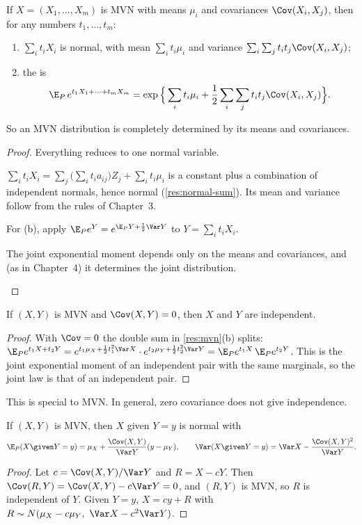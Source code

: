 \begin{result}
\label{res:mvn}
If $X=(X_1,\dots,X_m)$ is MVN with means $\mu_i$ and covariances $\Cov(X_i,X_j)$, then for any numbers $t_1,\dots,t_m$:
\begin{enumerate}[label=(\alph*)]
  \item $\sum_it_iX_i$ is normal, with mean $\sum_it_i\mu_i$ and variance $\sum_i\sum_jt_it_j\Cov(X_i,X_j)$;
  \item the  is
  \[
    \E_P\,e^{t_1X_1+\dots+t_mX_m}=\exp\Big\{\sum_it_i\mu_i+\frac12\sum_i\sum_jt_it_j\Cov(X_i,X_j)\Big\}.
  \]
\end{enumerate}
So an MVN distribution is completely determined by its means and covariances.
\end{result}
\begin{proof}
Everything reduces to one normal variable.
\begin{steps}
  \item $\sum_it_iX_i=\sum_j\big(\sum_it_ia_{ij}\big)Z_j+\sum_it_i\mu_i$ is a constant plus a combination of independent normals, hence normal (\cref{res:normal-sum}). Its mean and variance follow from the rules of Chapter~3.
  \item For (b), apply $\E_Pe^{Y}=e^{\E_PY+\frac12\Var Y}$ to $Y=\sum_it_iX_i$.
  \item The joint exponential moment depends only on the means and covariances, and (as in Chapter~4) it determines the joint distribution. \qedhere
\end{steps}
\end{proof}

\begin{result}
\label{res:uncorr}
If $(X,Y)$ is MVN and $\Cov(X,Y)=0$, then $X$ and $Y$ are independent.
\end{result}
\begin{proof}
With $\Cov=0$ the double sum in \cref{res:mvn}(b) splits: $\E_Pe^{t_1X+t_2Y}=e^{t_1\mu_X+\frac12t_1^2\Var X}\cdot e^{t_2\mu_Y+\frac12t_2^2\Var Y}=\E_Pe^{t_1X}\,\E_Pe^{t_2Y}$. This is the joint exponential moment of an independent pair with the same marginals, so the joint law is that of an independent pair.
\end{proof}

This is special to MVN. In general, zero covariance does not give independence.

\begin{result}
\label{res:mvn-cond}
If $(X,Y)$ is MVN, then $X$ given $Y=y$ is normal with
\[
  \E_P(X\given Y=y)=\mu_X+\frac{\Cov(X,Y)}{\Var Y}(y-\mu_Y),\qquad \Var(X\given Y=y)=\Var X-\frac{\Cov(X,Y)^2}{\Var Y}.
\]
\end{result}
\begin{proof}
Let $c=\Cov(X,Y)/\Var Y$ and $R=X-cY$. Then $\Cov(R,Y)=\Cov(X,Y)-c\Var Y=0$, and $(R,Y)$ is MVN, so $R$ is independent of $Y$. Given $Y=y$, $X=cy+R$ with $R\sim N(\mu_X-c\mu_Y,\ \Var X-c^2\Var Y)$.
\end{proof}

